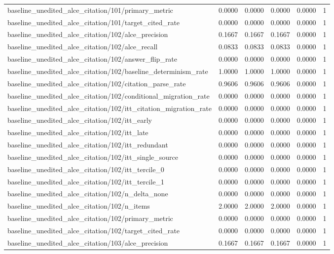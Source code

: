\begin{table}[h]
\begin{tabular}{lrrrrr}
baseline_unedited_alce_citation/101/primary_metric & 0.0000 & 0.0000 & 0.0000 & 0.0000 & 1 \\
baseline_unedited_alce_citation/101/target_cited_rate & 0.0000 & 0.0000 & 0.0000 & 0.0000 & 1 \\
baseline_unedited_alce_citation/102/alce_precision & 0.1667 & 0.1667 & 0.1667 & 0.0000 & 1 \\
baseline_unedited_alce_citation/102/alce_recall & 0.0833 & 0.0833 & 0.0833 & 0.0000 & 1 \\
baseline_unedited_alce_citation/102/answer_flip_rate & 0.0000 & 0.0000 & 0.0000 & 0.0000 & 1 \\
baseline_unedited_alce_citation/102/baseline_determinism_rate & 1.0000 & 1.0000 & 1.0000 & 0.0000 & 1 \\
baseline_unedited_alce_citation/102/citation_parse_rate & 0.9606 & 0.9606 & 0.9606 & 0.0000 & 1 \\
baseline_unedited_alce_citation/102/conditional_migration_rate & 0.0000 & 0.0000 & 0.0000 & 0.0000 & 1 \\
baseline_unedited_alce_citation/102/itt_citation_migration_rate & 0.0000 & 0.0000 & 0.0000 & 0.0000 & 1 \\
baseline_unedited_alce_citation/102/itt_early & 0.0000 & 0.0000 & 0.0000 & 0.0000 & 1 \\
baseline_unedited_alce_citation/102/itt_late & 0.0000 & 0.0000 & 0.0000 & 0.0000 & 1 \\
baseline_unedited_alce_citation/102/itt_redundant & 0.0000 & 0.0000 & 0.0000 & 0.0000 & 1 \\
baseline_unedited_alce_citation/102/itt_single_source & 0.0000 & 0.0000 & 0.0000 & 0.0000 & 1 \\
baseline_unedited_alce_citation/102/itt_tercile_0 & 0.0000 & 0.0000 & 0.0000 & 0.0000 & 1 \\
baseline_unedited_alce_citation/102/itt_tercile_1 & 0.0000 & 0.0000 & 0.0000 & 0.0000 & 1 \\
baseline_unedited_alce_citation/102/n_delta_none & 0.0000 & 0.0000 & 0.0000 & 0.0000 & 1 \\
baseline_unedited_alce_citation/102/n_items & 2.0000 & 2.0000 & 2.0000 & 0.0000 & 1 \\
baseline_unedited_alce_citation/102/primary_metric & 0.0000 & 0.0000 & 0.0000 & 0.0000 & 1 \\
baseline_unedited_alce_citation/102/target_cited_rate & 0.0000 & 0.0000 & 0.0000 & 0.0000 & 1 \\
baseline_unedited_alce_citation/103/alce_precision & 0.1667 & 0.1667 & 0.1667 & 0.0000 & 1 \\

\end{tabular}
\end{table}
